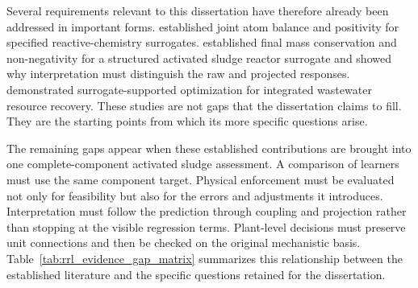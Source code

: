 Several requirements relevant to this dissertation have therefore already been addressed in important forms. \citet{KircherVotsmeier2025} established joint atom balance and positivity for specified reactive-chemistry surrogates. \citet{Selerio2026} established final mass conservation and non-negativity for a structured activated sludge reactor surrogate and showed why interpretation must distinguish the raw and projected responses. \citet{Durkin2024} demonstrated surrogate-supported optimization for integrated wastewater resource recovery. These studies are not gaps that the dissertation claims to fill. They are the starting points from which its more specific questions arise.

The remaining gaps appear when these established contributions are brought into one complete-component activated sludge assessment. A comparison of learners must use the same component target. Physical enforcement must be evaluated not only for feasibility but also for the errors and adjustments it introduces. Interpretation must follow the prediction through coupling and projection rather than stopping at the visible regression terms. Plant-level decisions must preserve unit connections and then be checked on the original mechanistic basis. Table~\ref{tab:rrl_evidence_gap_matrix} summarizes this relationship between the established literature and the specific questions retained for the dissertation.

